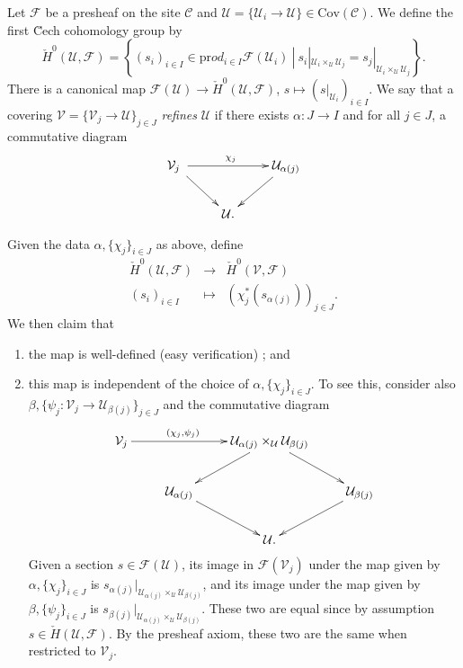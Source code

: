 \begin{definition}
Let $\mathcal{F}$ be a presheaf on the site $\mathcal{C}$ and $\mathcal{U} = \{ \mathcal{U}_i \to \mathcal{U}\} \in \text{Cov} (\mathcal{C})$. We define the first \u Cech cohomology group by
$$
\check H^0 (\mathcal{U}, \mathcal{F}) = \left\{\left.  (s_i)_{i\in I} \in \text{pr}od_{i\in I }\mathcal{F}(\mathcal{U}_i) \ \right| \ s_i |_{\mathcal{U}_i \times_\mathcal{U} \mathcal{U}_j} = s_j |_{\mathcal{U}_i \times_\mathcal{U} \mathcal{U}_j} \right\}.
$$
There is a canonical map $ \mathcal{F}(\mathcal{U}) \to \check H^0 (\mathcal{U}, \mathcal{F})$, $s \mapsto (s |_{\mathcal{U}_i})_{i\in I}.$
We say that a covering $\mathcal{V} = \{ \mathcal{V}_j \to \mathcal{U}\}_{j \in J}$ \emph{refines} $\mathcal{U}$ if there exists $\alpha : J \to I$ and for all $j \in J$, a commutative diagram
$$
\xymatrix{
{\mathcal{V}_j\ } \ar^{\chi_j}[rr] \ar[dr] & &{\mathcal{U}_{\alpha(j)}} \ar[dl] \\
& {\mathcal{U}.}
}
$$ 
\end{definition}

Given the data $\alpha, \{\chi_j\}_{i\in J}$ as above, define
\begin{eqnarray*}
\check H^0 (\mathcal{U}, \mathcal{F}) & \to & \check H^0 (\mathcal{V}, \mathcal{F}) \\
(s_i)_{i\in I} & \mapsto & \left(\chi_j^*\left(s _{\alpha(j)}\right)\right)_{j\in J}.
\end{eqnarray*}
We then claim that 
\begin{enumerate}
\item the map is well-defined (easy verification) ; and
\item this map is independent of the choice of $\alpha, \{\chi_j\}_{i\in J}$. To see this, consider also $\beta, \{\psi_j : \mathcal{V}_j \to \mathcal{U}_{\beta(j)}\}_{j \in J}$ and the commutative diagram
$$
\xymatrix{
{\mathcal{V}_j}  \ar^{(\chi_j, \psi_j)\qquad}[rr] & & {\mathcal{U}_{\alpha(j)}\times_\mathcal{U} \mathcal{U}_{\beta(j)}} \ar[dl] \ar[dr] \\
& {\mathcal{U}_{\alpha(j)}} \ar[dr] && {\mathcal{U}_{\beta(j)}} \ar[dl] \\
& &{\mathcal{U}.}
}
$$
Given a section $s \in \mathcal{F}(\mathcal{U})$, its image in $\mathcal{F}(\mathcal{V}_j)$ under the map given by $\alpha, \{\chi_j\}_{i\in J}$ is $s_{\alpha(j)} | _{{\mathcal{U}_{\alpha(j)}\times_\mathcal{U} \mathcal{U}_{\beta(j)}}}$, and its image under the map given by $\beta, \{\psi_j\}_{i\in J}$ is $s_{\beta(j)} | _{{\mathcal{U}_{\alpha(j)}\times_\mathcal{U} \mathcal{U}_{\beta(j)}}}$. These two are equal since by assumption $s \in \check H(\mathcal{U}, \mathcal{F})$. By the presheaf axiom, these two are the same when restricted to $\mathcal{V}_j$.
\end{enumerate}

